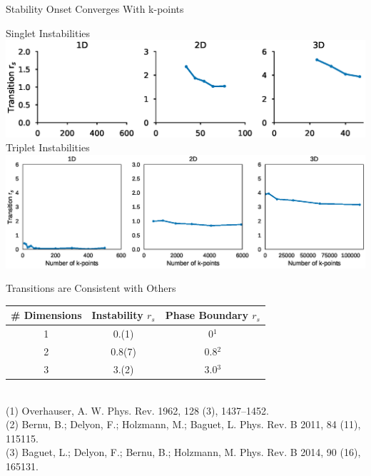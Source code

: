 \documentclass[10pt]{beamer}
\begin{document}
{{{{{{{{{{{{\begin{frame}{Stability Onset Converges With k-points}
  \centering 
  \begin{overprint}
    \centering
    \centering Singlet Instabilities\\ \vspace{5mm}
    \includegraphics[width=\linewidth]{../figures/singlet_onset.eps}
  	\onslide<2>\centering Triplet Instabilities\\ \vspace{5mm}
  	\includegraphics[width=\linewidth]{../figures/triplet_onset.eps}
	\end{overprint}
\end{frame}



{%
\begin{frame}{Transitions are Consistent with Others}
  \centering
  \begin{tabular}{ c | c | c } 
  \# Dimensions & Instability $r_s$ & Phase Boundary $r_s$ \\
  \hline
  1 & 0.(1) & 0$^1$ \\ 
  2 & 0.8(7)  & 0.8$^2$ \\ 
  3 & 3.(2)  & 3.0$^3$ \\ 
  \end{tabular}\\
  \vspace{5mm}
  \scriptsize
  (1) Overhauser, A. W. Phys. Rev. 1962, 128 (3), 1437–1452. \\
  (2) Bernu, B.; Delyon, F.; Holzmann, M.; Baguet, L. Phys. Rev. B 2011, 84 (11), 115115.\\
  (3) Baguet, L.; Delyon, F.; Bernu, B.; Holzmann, M. Phys. Rev. B 2014, 90 (16), 165131.
\end{frame}


}}}}}}}}}}}}}
\end{document}
